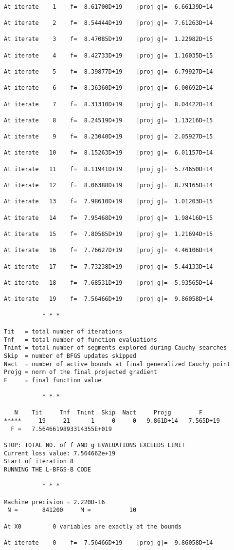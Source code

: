 \documentclass[11pt]{article}
\begin{document}
    \begin{Verbatim}[commandchars=\\\{\}]

At iterate    1    f=  8.61700D+19    |proj g|=  6.66139D+14

At iterate    2    f=  8.54444D+19    |proj g|=  7.61263D+14

At iterate    3    f=  8.47085D+19    |proj g|=  1.22982D+15

At iterate    4    f=  8.42733D+19    |proj g|=  1.16035D+15

At iterate    5    f=  8.39877D+19    |proj g|=  6.79927D+14

At iterate    6    f=  8.36360D+19    |proj g|=  6.00692D+14

At iterate    7    f=  8.31310D+19    |proj g|=  8.04422D+14

At iterate    8    f=  8.24519D+19    |proj g|=  1.13216D+15

At iterate    9    f=  8.23040D+19    |proj g|=  2.05927D+15

At iterate   10    f=  8.15263D+19    |proj g|=  6.01157D+14

At iterate   11    f=  8.11941D+19    |proj g|=  5.74650D+14

At iterate   12    f=  8.06388D+19    |proj g|=  8.79165D+14

At iterate   13    f=  7.98610D+19    |proj g|=  1.01203D+15

At iterate   14    f=  7.95468D+19    |proj g|=  1.98416D+15

At iterate   15    f=  7.80585D+19    |proj g|=  1.21694D+15

At iterate   16    f=  7.76627D+19    |proj g|=  4.46106D+14

At iterate   17    f=  7.73238D+19    |proj g|=  5.44133D+14

At iterate   18    f=  7.68531D+19    |proj g|=  5.93565D+14

At iterate   19    f=  7.56466D+19    |proj g|=  9.86058D+14

           * * *

Tit   = total number of iterations
Tnf   = total number of function evaluations
Tnint = total number of segments explored during Cauchy searches
Skip  = number of BFGS updates skipped
Nact  = number of active bounds at final generalized Cauchy point
Projg = norm of the final projected gradient
F     = final function value

           * * *

   N    Tit     Tnf  Tnint  Skip  Nact     Projg        F
*****     19     21      1     0     0   9.861D+14   7.565D+19
  F =   7.5646619893314355E+019

STOP: TOTAL NO. of f AND g EVALUATIONS EXCEEDS LIMIT
Current loss value: 7.564662e+19
Start of iteration 8
RUNNING THE L-BFGS-B CODE

           * * *

Machine precision = 2.220D-16
 N =       841200     M =           10

At X0         0 variables are exactly at the bounds

At iterate    0    f=  7.56466D+19    |proj g|=  9.86058D+14
    \end{Verbatim}
\end{document}
